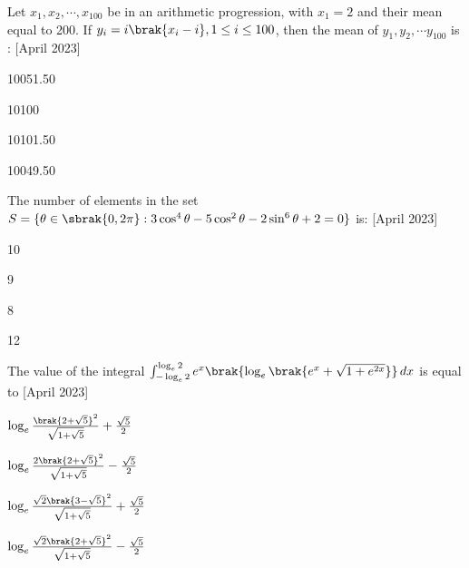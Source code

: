 \iffalse
\title{2023}
\author{EE24BTECH11063}
\section{mcq-single}
\fi
    \item Let $x_1,x_2,\cdots ,x_{100}$ be in an arithmetic progression, with $x_1=2$ and their mean equal to 200. If $y_i=i\brak{x_i-i},1 \le i \le 100$, then the mean of $y_1,y_2,\cdots y_{100}$ is : \hfill{[April 2023]}
    \begin{enumerate}
    \begin{multicols}{4}
    \item 10051.50
    \item 10100
    \item 10101.50
    \item 10049.50
    \end{multicols}
        \end{enumerate}
        \bigskip
        \item The number of elements in the set $S=\{\theta \in \sbrak{0,2\pi}:3\cos^{4}{\theta}-5\cos^{2}{\theta}-2\sin^{6}{\theta}+2=0\}$ is: \hfill{[April 2023]}
        \begin{enumerate}
        \begin{multicols}{4}
            \item 10
            \item 9
            \item 8
            \item 12
            \end{multicols}
        \end{enumerate}
        \bigskip
\item The value of the integral $\int_{-\log_{e}{2}}^{\log_{e}{2}} e^x\brak{\log_{e}{\brak{e^x+\sqrt{1+e^{2x}}}}}  \, dx$ is equal to \hfill{[April 2023]}
        \begin{enumerate}
        \begin{multicols}{2}
        \item $\log_{e}{\frac{\brak{2+\sqrt{5}}^2}{\sqrt{1+\sqrt{5}}}}+\frac{\sqrt{5}}{2}$
          \item $\log_{e}{\frac{2\brak{2+\sqrt{5}}^2}{\sqrt{1+\sqrt{5}}}}-\frac{\sqrt{5}}{2}$ 
          \item $\log_{e}{\frac{\sqrt{2}\brak{3-\sqrt{5}}^2}{\sqrt{1+\sqrt{5}}}}+\frac{\sqrt{5}}{2}$ 
          \item $\log_{e}{\frac{\sqrt{2}\brak{2+\sqrt{5}}^2}{\sqrt{1+\sqrt{5}}}}-\frac{\sqrt{5}}{2}$
        \end{multicols}
        \end{enumerate}
